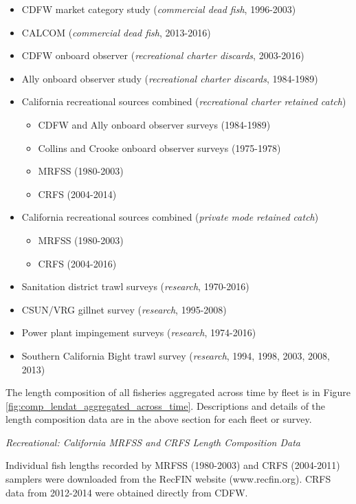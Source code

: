 \documentclass[12pt,]{article}
\begin{document}
\begin{itemize}[noitemsep,nolistsep,topsep=0pt]
  \item CDFW market category study (\emph{commercial dead fish}, 1996-2003)    
  \item CALCOM (\emph{commercial dead fish}, 2013-2016)    
  \item CDFW onboard observer (\emph{recreational charter discards}, 2003-2016)    
  \item Ally onboard observer study (\emph{recreational charter discards}, 1984-1989)  
  \item California recreational sources combined (\emph{recreational charter retained catch})     
    \begin{itemize}[noitemsep,nolistsep]
      \item CDFW and Ally onboard observer surveys (1984-1989)     
      \item Collins and Crooke onboard observer surveys (1975-1978)     
      \item MRFSS (1980-2003)     
      \item CRFS (2004-2014)
    \end{itemize}
 \item California recreational sources combined (\emph{private mode retained catch})      
    \begin{itemize}[noitemsep,nolistsep]   
      \item MRFSS (1980-2003)      
      \item CRFS (2004-2016)  
    \end{itemize}
 \item Sanitation district trawl surveys (\emph{research}, 1970-2016)      
 \item CSUN/VRG gillnet survey (\emph{research}, 1995-2008)        
 \item Power plant impingement surveys (\emph{research}, 1974-2016)  
 \item Southern California Bight trawl survey (\emph{research}, 1994, 1998, 2003, 2008, 2013) 
\end{itemize}

The length composition of all fisheries aggregated across time by fleet
is in Figure \ref{fig:comp_lendat_aggregated_across_time}. Descriptions
and details of the length composition data are in the above section for
each fleet or survey.

\emph{Recreational: California MRFSS and CRFS Length Composition Data}

Individual fish lengths recorded by MRFSS (1980-2003) and CRFS
(2004-2011) samplers were downloaded from the RecFIN website
(www.recfin.org). CRFS data from 2012-2014 were obtained directly from
CDFW.
\end{document}
